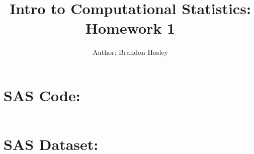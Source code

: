 \documentclass[a4paper,man,natbib]{apa6}
\title{Intro to Computational Statistics: Homework 1}
\author{Author: Brandon Hosley}
\affiliation{Instructor: Liang Kong, Ph.D}
\begin{document}
	\maketitle
	
	\section{SAS Code:}
	\singlespacing
	\inputminted[bgcolor=light-gray]{sas}{./DAT502-HW1.sas}
	\clearpage
	
	\section{SAS Dataset:}
\end{document}
